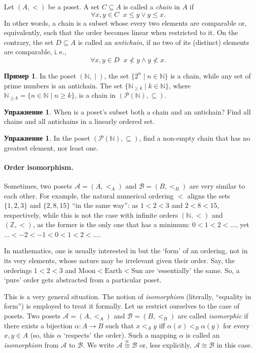 \documentclass[12pt,notitlepage]{article}
\theoremstyle{plain}
\theoremstyle{definition}
\newtheorem{exc}[thm]{Упражнение}
\newtheorem{exm}[thm]{Пример}
\theoremstyle{plain}
\newcommand{\N}{\mathbb{N}}
\newcommand{\Z}{\mathbb{Z}}
\newcommand{\sbs}{\subseteq}
\newcommand{\mP}{\mathcal{P}}
\newcommand{\1}{\mathbf{1}}
\newcommand{\0}{\mathbf{0}}
\newcommand{\dvd}{\mathop{\mid}}
\begin{document}
Let $(A,<)$ be a poset. A set $C \sbs A$ is called a \emph{chain} in $A$ if
$$\forall x, y \in C\;\; x \leq y \vee y \leq x.$$
In other words, a chain is a subset whose every two elements are comparable or, equivalently, such that the order becomes linear when restricted to it. On the contrary, the set $D \sbs A$ is called an \emph{antichain}, if no two of its (distinct) elements are comparable, i.\,e.,
$$\forall x, y \in D\;\; x \nless y \wedge y \nless x.$$
\begin{exm}
	In the poset $(\N, {\dvd})$, the set $\{2^n \mid n \in \N \}$ is a chain, while any set of prime numbers is an antichain. The set $\{ \N_{\geq k} \mid k \in \N \}$, where $\N_{\geq k} = \{ n \in \N\mid n \geq k \}$, is a chain in $(\mP(\N), {\sbs})$.
\end{exm}
\begin{exc}
	When is a poset's subset both a chain and an antichain? Find all chains and all antichains in a linearly ordered set.
\end{exc}
\begin{exc}
	In the poset $(\mP(\N), \sbs)$, find a non-empty chain that has no greatest element, nor least one.
\end{exc}

\paragraph{Order isomorphism.} Sometimes, two posets $\mathcal A = (A, <_A)$ and $\mathcal B = (B, <_B)$ are very similar to each other. For example, the natural numerical ordering $<$ aligns the sets $\{1,2,3\}$ and $\{2, 8, 15\}$ ``in the same way'': as $1 < 2 < 3$ and $2 < 8 < 15$, respectively, while this is not the case with infinite orders $(\N, <)$ and $(\Z, <)$, as the former is the only one that has a minimum: $0 < 1 < 2 < \ldots$, yet $\ldots < -2 < -1 < 0 < 1 < 2 < \ldots$.

In mathematics, one is usually interested in but the `form' of an ordering, not in its very elements, whose nature may be irrelevant given their order. Say, the orderings $1 < 2 < 3$ and $\mbox{Moon} < \mbox{Earth} < \mbox{Sun}$ are `essentially' the same. So, a `pure' order gets abstracted from a particular poset.

This is a very general situation. The notion of \emph{isomorphism} (literally, ``equality in form'') is employed to treat it formally. Let us restrict ourselves to the case of posets. Two posets $\mathcal A = (A, <_A)$ and $\mathcal B = (B, <_B)$ are called \emph{isomorphic} if there exists a bijection $\alpha\colon A \to B$ such that $x <_A y$ iff $\alpha(x) <_B \alpha(y)$ for every $x, y \in A$ (so, this $\alpha$ `respects' the order). Such a mapping $\alpha$ is called an \emph{isomorphism} from $\mathcal A$ to $\mathcal B$. We write $\mathcal A \stackrel{\alpha}{\cong} \mathcal B$ or, less explicitly, $\mathcal A \cong \mathcal B$ in this case.
\end{document}
